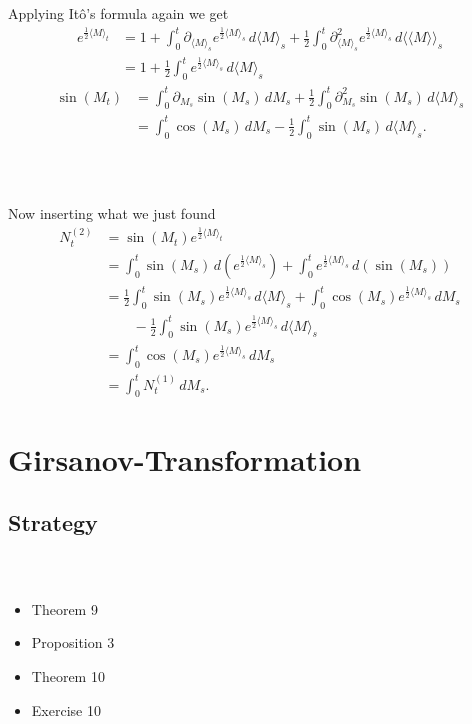 \documentclass{beamer}
\numberwithin{equation}{section}
\newenvironment{frame2}{\begin{frame}\frametitle{{\normalsize \secname} \\ {\large \subsecname}}}{\end{frame}}
\begin{document}
\begin{frame2}
    Applying Itô's formula again we get
    \begin{align}
        e^{\frac{1}{2}\langle M \rangle_t} &= 1 + \int_0^t\partial_{\langle M \rangle_s}e^{\frac{1}{2}\langle M \rangle_s}\, d\langle M \rangle_s + \frac{1}{2}\int_0^t\partial^2_{\langle M \rangle_s} e^{\frac{1}{2}\langle M \rangle_s} \, d \langle\langle M \rangle\rangle_s \nonumber \\
        &= 1 + \frac{1}{2}\int_0^te^{\frac{1}{2}\langle M \rangle_s}\, d\langle M \rangle_s
    \end{align}
    \begin{align}
        \sin(M_t) &= \int_0^t\partial_{M_s}\sin(M_s)\, dM_s + \frac{1}{2}\int_0^t\partial_{M_s}^2\sin(M_s) \, d \langle M \rangle_s \\
        &= \int_0^t \cos(M_s) \, dM_s - \frac{1}{2}\int_0^t\sin(M_s)\, d\langle M \rangle_s.
    \end{align}
\end{frame2}

\begin{frame2}
    Now inserting what we just found
    \begin{align*}
        N_t^{(2)} &= \sin(M_t)e^{\frac{1}{2}\langle M \rangle_t} \\
       &= \int_0^t \sin(M_s) \, d\left(e^{\frac{1}{2}\langle M \rangle_s}\right) + \int_0^t e^{\frac{1}{2}\langle M \rangle_s} \, d \left(\sin(M_s)\right) \\
       &= \frac{1}{2}\int_0^t\sin(M_s)e^{\frac{1}{2}\langle M \rangle_s}\, d\langle M \rangle_s + \int_0^t\cos(M_s)e^{\frac{1}{2}\langle M \rangle_s}\, dM_s \\
       &\qquad - \frac{1}{2}\int_0^t\sin(M_s)e^{\frac{1}{2}\langle M \rangle_s}\, d\langle M \rangle_s \\
       &= \int_0^t\cos(M_s)e^{\frac{1}{2}\langle M \rangle_s}\, dM_s \\
       &= \int_0^tN_t^{(1)} \, dM_s.
   \end{align*}
\end{frame2}

\section{Girsanov-Transformation}

\subsection{Strategy}
\begin{frame2}
    \begin{itemize}
        \item Theorem 9
        \item Proposition 3
        \item Theorem 10
        \item Exercise 10
    \end{itemize}
\end{frame2}
\end{document}
